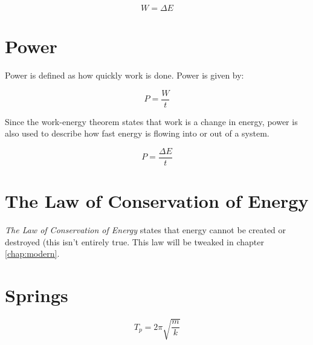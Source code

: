 		\begin{mdframed}[backgroundcolor=orange!20!white]
		\begin{equation}
			W = \Delta E
			\label{equation:workenergy}
		\end{equation}
	\end{mdframed}
	
		\section{Power}
	
	
	Power is defined as how quickly work is done.  Power is given by:
	
	\begin{mdframed}[backgroundcolor=orange!20!white]
		\begin{equation}
			P = \frac{W}{t}
			\label{equation:power}
		\end{equation}
	\end{mdframed}
	
	Since the work-energy theorem states that work is a change in energy, power is also used to describe how fast energy is flowing into or out of a system.
	
	\begin{mdframed}[backgroundcolor=orange!20!white]
		\begin{equation}
			P = \frac{\Delta E}{t}
			\label{equation:poweralt}
		\end{equation}
	\end{mdframed}
	

	
	
	\section{The Law of Conservation of Energy}
	\textit{The Law of Conservation of Energy} states that energy cannot be created or destroyed (this isn't entirely true.  This law will be tweaked in chapter \ref{chap:modern}.
	
	\section{Springs}
	
		\begin{mdframed}[backgroundcolor=orange!20!white]
		\begin{equation}
		T_p = 2 \pi \sqrt{\frac{m}{k}}
		\label{eqn:springperiod}
		\end{equation}
	\end{mdframed}
	
